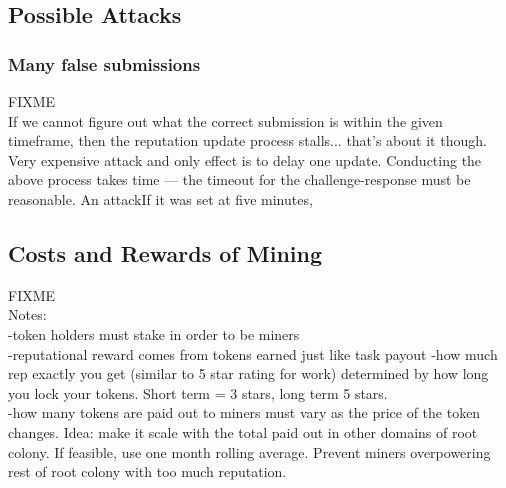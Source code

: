 \subsection{Possible Attacks}
\subsubsection*{Many false submissions}
FIXME\\ If we cannot figure out what the correct submission is within the given timeframe, then the reputation update process stalls... that's about it though. Very expensive attack and only effect is to delay one update.
Conducting the above process takes time --- the timeout for the challenge-response must be reasonable. An attackIf it was set at five minutes, 


\subsection{Costs and Rewards of Mining}\label{subsec:mining-costs-and-rewards}
FIXME\\
Notes:\\
-token holders must stake in order to be miners\\
-reputational reward comes from tokens earned just like task payout
-how much rep exactly you get (similar to 5 star rating for work) determined by how long you lock your tokens. Short term = 3 stars, long term 5 stars.\\
-how many tokens are paid out to miners must vary as the price of the token changes. Idea: make it scale with the total paid out in other domains of root colony. If feasible, use one month rolling average. Prevent miners overpowering rest of root colony with too much reputation.

